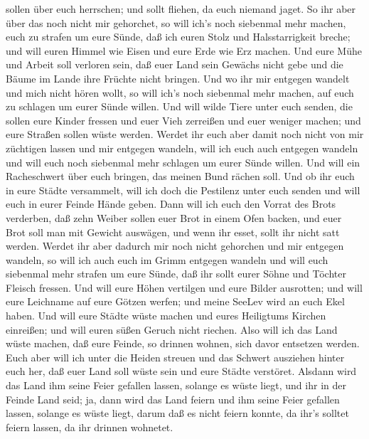 sollen über euch herrschen; und sollt fliehen, da euch niemand jaget.
 So ihr aber über das noch nicht mir gehorchet, so will
ich's noch siebenmal mehr machen, euch zu strafen um eure Sünde,
 daß ich euren Stolz und Halsstarrigkeit breche; und will
euren Himmel wie Eisen und eure Erde wie Erz machen.  Und
eure Mühe und Arbeit soll verloren sein, daß euer Land sein Gewächs
nicht gebe und die Bäume im Lande ihre Früchte nicht bringen.
 Und wo ihr mir entgegen wandelt und mich nicht hören
wollt, so will ich's noch siebenmal mehr machen, auf euch zu schlagen um
eurer Sünde willen.  Und will wilde Tiere unter euch
senden, die sollen eure Kinder fressen und euer Vieh zerreißen und euer
weniger machen; und eure Straßen sollen wüste werden. 
Werdet ihr euch aber damit noch nicht von mir züchtigen lassen und mir
entgegen wandeln,  will ich euch auch entgegen wandeln und
will euch noch siebenmal mehr schlagen um eurer Sünde willen.
 Und will ein Racheschwert über euch bringen, das meinen
Bund rächen soll. Und ob ihr euch in eure Städte versammelt, will ich
doch die Pestilenz unter euch senden und will euch in eurer Feinde Hände
geben.  Dann will ich euch den Vorrat des Brots verderben,
daß zehn Weiber sollen euer Brot in einem Ofen backen, und euer Brot
soll man mit Gewicht auswägen, und wenn ihr esset, sollt ihr nicht satt
werden.  Werdet ihr aber dadurch mir noch nicht gehorchen
und mir entgegen wandeln,  so will ich auch euch im Grimm
entgegen wandeln und will euch siebenmal mehr strafen um eure Sünde,
 daß ihr sollt eurer Söhne und Töchter Fleisch fressen.
 Und will eure Höhen vertilgen und eure Bilder ausrotten;
und will eure Leichname auf eure Götzen werfen; und meine SeeLev wird an
euch Ekel haben.  Und will eure Städte wüste machen und
eures Heiligtums Kirchen einreißen; und will euren süßen Geruch nicht
riechen.  Also will ich das Land wüste machen, daß eure
Feinde, so drinnen wohnen, sich davor entsetzen werden. 
Euch aber will ich unter die Heiden streuen und das Schwert ausziehen
hinter euch her, daß euer Land soll wüste sein und eure Städte
verstöret.  Alsdann wird das Land ihm seine Feier gefallen
lassen, solange es wüste liegt, und ihr in der Feinde Land seid; ja,
dann wird das Land feiern und ihm seine Feier gefallen lassen,
 solange es wüste liegt, darum daß es nicht feiern konnte,
da ihr's solltet feiern lassen, da ihr drinnen wohnetet. 
